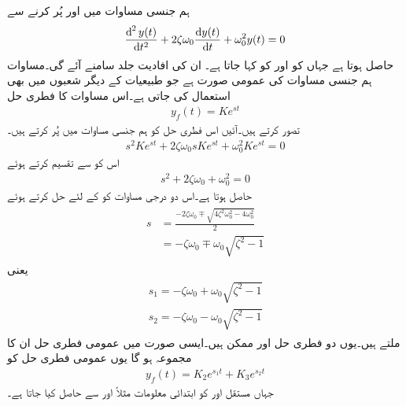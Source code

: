 ہم جنسی مساوات میں  اور  پُر کرنے سے
\begin{align}\label{مساوات_عارضی_دو_درجی_عمومی_ہم_جنسی_ب}
\frac{\dif^{\,2} y(t)}{\dif t^2}+2\zeta \omega_0\frac{\dif y(t)}{\dif t}+\omega_0^2 y(t)=0
\end{align}
حاصل ہوتا ہے جہاں  کو 
 اور  کو  کہا جاتا ہے۔ ان کی افادیت جلد سامنے آئے گی۔مساوات   ہم جنسی مساوات کی عمومی صورت ہے جو طبیعیات کے دیگر شعبوں میں بھی استعمال کی جاتی ہے۔اس مساوات کا فطری حل
\begin{align*}
y_f(t)=Ke^{st}
\end{align*}
تصور کرتے ہیں۔آئیں اس فطری حل کو ہم جنسی مساوات میں پُر کرتے ہیں۔
\begin{align*}
s^2 K e^{st}+2\zeta\omega_0 s K e^{st}+\omega_0^2 K e^{st}=0
\end{align*}
اس کو  سے تقسیم کرتے ہوئے
\begin{align}
s^2+2\zeta\omega_0+\omega_0^2=0
\end{align}
حاصل ہوتا ہے۔اس دو درجی مساوات کو  کے لئے حل کرتے ہوئے
\begin{gather}
\begin{aligned}
s&=\frac{-2\zeta\omega_0\mp\sqrt{4\zeta^2\omega_0^2-4\omega_0^2}}{2}\\
&=-\zeta\omega_0\mp \omega_0\sqrt{\zeta^2-1}
\end{aligned}
\end{gather}
یعنی
\begin{gather}
\begin{aligned}\label{مساوات_عارضی_دو_درجی_ہم_سمتی_عمومی_حل_الف}
s_1=-\zeta\omega_0+ \omega_0\sqrt{\zeta^2-1}\\
s_2=-\zeta\omega_0- \omega_0\sqrt{\zeta^2-1}
\end{aligned}
\end{gather}
ملتے ہیں۔یوں دو فطری حل  اور  ممکن ہیں۔ایسی صورت میں عمومی فطری حل ان کا مجموعہ ہو گا
یوں عمومی فطری حل کو 
\begin{align}
y_f(t)=K_2 e^{s_1 t}+K_3 e^{s_2 t}
\end{align}
جہاں مستقل  اور  کو ابتدائی معلومات مثلاً  اور  سے حاصل کیا جاتا ہے۔

